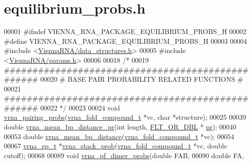 \hypertarget{equilibrium__probs_8h_source}{}\section{equilibrium\+\_\+probs.\+h}
\label{equilibrium__probs_8h_source}

\begin{DoxyCode}
00001 \textcolor{preprocessor}{#ifndef VIENNA\_RNA\_PACKAGE\_EQUILIBRIUM\_PROBS\_H}
00002 \textcolor{preprocessor}{#define VIENNA\_RNA\_PACKAGE\_EQUILIBRIUM\_PROBS\_H}
00003 
00004 \textcolor{preprocessor}{#include <\mbox{\hyperlink{data__structures_8h}{ViennaRNA/data\_structures.h}}>}
00005 \textcolor{preprocessor}{#include <\mbox{\hyperlink{params_8h}{ViennaRNA/params.h}}>}
00006 
00018 \textcolor{comment}{/*}
00019 \textcolor{comment}{#################################################}
00020 \textcolor{comment}{# BASE PAIR PROBABILITY RELATED FUNCTIONS       #}
00021 \textcolor{comment}{#################################################}
00022 \textcolor{comment}{*/}
00023 
00024 \textcolor{keywordtype}{void}  \mbox{\hyperlink{equilibrium__probs_8h_a9adbf00dfee870d539f9bc3ebc2dadd1}{vrna\_pairing\_probs}}(\mbox{\hyperlink{group__fold__compound_structvrna__fc__s}{vrna\_fold\_compound\_t}} *vc, \textcolor{keywordtype}{char} *structure);
00025 
00039 \textcolor{keywordtype}{double} \mbox{\hyperlink{group__pf__fold_gad3f0c240512e6d43e2e4d4c2076021f5}{vrna\_mean\_bp\_distance\_pr}}(\textcolor{keywordtype}{int} length, \mbox{\hyperlink{group__data__structures_ga31125aeace516926bf7f251f759b6126}{FLT\_OR\_DBL}} *
      \mbox{\hyperlink{fold__vars_8h_ac98ec419070aee6831b44e5c700f090f}{pr}});
00040 
00053 \textcolor{keywordtype}{double} \mbox{\hyperlink{group__pf__fold_gaa6b8983b559b9ef4b2e1b31113ea317b}{vrna\_mean\_bp\_distance}}(\mbox{\hyperlink{group__fold__compound_structvrna__fc__s}{vrna\_fold\_compound\_t}} *vc);
00054 
00067 \mbox{\hyperlink{group__struct__utils_structvrna__elem__prob__s}{vrna\_ep\_t}} *\mbox{\hyperlink{group__pf__fold_ga132664bf29fdc30bb5ea715491d1ab22}{vrna\_stack\_prob}}(\mbox{\hyperlink{group__fold__compound_structvrna__fc__s}{vrna\_fold\_compound\_t}} *vc, \textcolor{keywordtype}{double} 
      cutoff);
00068 
00089 \textcolor{keywordtype}{void}  \mbox{\hyperlink{group__pf__cofold_gaa1e39e73afb51fbaf4ae38f0c066c46b}{vrna\_pf\_dimer\_probs}}(\textcolor{keywordtype}{double}                  FAB,
00090                           \textcolor{keywordtype}{double}                  FA,

\end{DoxyCode}
